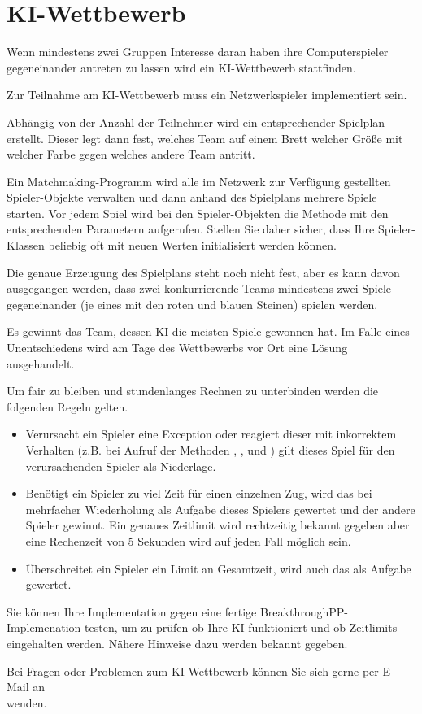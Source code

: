 \section*{KI-Wettbewerb}
Wenn mindestens zwei Gruppen Interesse daran haben ihre Computerspieler gegeneinander antreten zu lassen wird ein KI-Wettbewerb stattfinden.

Zur Teilnahme am KI-Wettbewerb muss ein Netzwerkspieler implementiert sein.

Abhängig von der Anzahl der Teilnehmer wird ein entsprechender Spielplan erstellt. Dieser legt dann fest, welches Team auf einem Brett welcher Größe mit welcher Farbe gegen welches andere Team antritt.

Ein Matchmaking-Programm wird alle im Netzwerk zur Verfügung gestellten Spieler-Objekte verwalten und dann anhand des Spielplans mehrere Spiele starten. Vor jedem Spiel wird bei den Spieler-Objekten die Methode  mit den entsprechenden Parametern aufgerufen. Stellen Sie daher sicher, dass Ihre Spieler-Klassen beliebig oft mit neuen Werten initialisiert werden können.

Die genaue Erzeugung des Spielplans steht noch nicht fest, aber es kann davon ausgegangen werden, dass zwei konkurrierende Teams mindestens zwei Spiele gegeneinander (je eines mit den roten und blauen Steinen) spielen werden.

Es gewinnt das Team, dessen KI die meisten Spiele gewonnen hat. Im Falle eines Unentschiedens wird am Tage des Wettbewerbs vor Ort eine Lösung ausgehandelt.

Um fair zu bleiben und stundenlanges Rechnen zu unterbinden werden die folgenden Regeln gelten.
\begin{itemize}
\item Verursacht ein Spieler eine Exception oder reagiert dieser mit inkorrektem Verhalten (z.B. bei Aufruf der Methoden , ,  und ) gilt dieses Spiel für den verursachenden Spieler als Niederlage.
\item Benötigt ein Spieler zu viel Zeit für einen einzelnen Zug, wird das bei mehrfacher Wiederholung als Aufgabe dieses Spielers gewertet und der andere Spieler gewinnt. Ein genaues Zeitlimit wird rechtzeitig bekannt gegeben aber eine Rechenzeit von 5 Sekunden wird auf jeden Fall möglich sein.
\item Überschreitet ein Spieler ein Limit an Gesamtzeit, wird auch das als Aufgabe gewertet.
\end{itemize}

Sie können Ihre Implementation gegen eine fertige BreakthroughPP-Implemenation testen, um zu prüfen ob Ihre KI funktioniert und ob Zeitlimits eingehalten werden. Nähere Hinweise dazu werden bekannt gegeben.

Bei Fragen oder Problemen zum KI-Wettbewerb können Sie sich gerne per E-Mail an \\
 wenden.